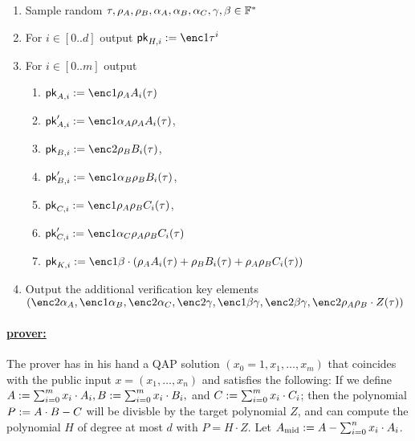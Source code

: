 \documentclass[11pt]{article}
\numberwithin{equation}{section} %
\numberwithin{figure}{section} %
\begin{document}
\begin{enumerate}
 \item Sample random $\tau,\rho_A,\rho_B,\alpha_A,\alpha_B,\alpha_C,\gamma,\beta\in \mathbb F^*$
 \item For $i\in [0..d]$ output $\pk_{H,i}\defeq \enc1{\tau^i}$
 \item For $i\in [0..m]$ output
 
 \begin{enumerate}
  \item $\pk_{A,i}\defeq \enc1{\rho_A A_i(\tau)}$
  
\item  $\pk'_{A,i}\defeq\enc1{\alpha_A\rho_A A_i(\tau)}$,
\item $\pk_{B,i}\defeq\enc2{\rho_B B_i(\tau)}$,
\item $\pk'_{B,i}\defeq \enc1{\alpha_B\rho_B B_i(\tau)}$,
\item $\pk_{C,i}\defeq \enc1{\rho_A\rho_B C_i(\tau)}$,
\item $\pk'_{C,i}\defeq \enc1{\alpha_C \rho_A\rho_B C_i(\tau)}$ 
\item $\pk_{K,i}\defeq \enc1{\beta\cdot (\rho_A A_i(\tau) + \rho_B B_i(\tau) + \rho_A\rho_B C_i(\tau))}$ 

\end{enumerate}
\item Output the additional verification key elements $(\enc2{\alpha_A},\enc1{\alpha_B},\enc2{\alpha_C},\enc2{\gamma},\enc1{\beta\gamma},\enc2{\beta\gamma},\enc2{\rho_A\rho_B \cdot Z(\tau)})$
 \end{enumerate}

\newcommand{\Amid}{\ensuremath{A_{\mathrm{mid}}}\xspace}
\paragraph{\underline{\bctv prover:}\\}
The prover has in his hand a QAP solution $(x_0=1,x_1,\ldots,x_m)$ that coincides with the public input $x=(x_1,\ldots,x_n)$ and satisfies the following:
If we define $A:= \sum_{i=0}^m x_i\cdot A_i, B:= \sum_{i=0}^m x_i \cdot B_i,$ and $C:= \sum_{i=0}^m x_i \cdot C_i$;
then the polynomial $P:= A\cdot B - C$ will be divisble by the target polynomial $Z$, and \per can compute the polynomial $H$ of degree at most $d$ with $P=H\cdot Z$. Let $\Amid\defeq A -\sum_{i=0}^n x_i\cdot A_i$.
\end{document}
